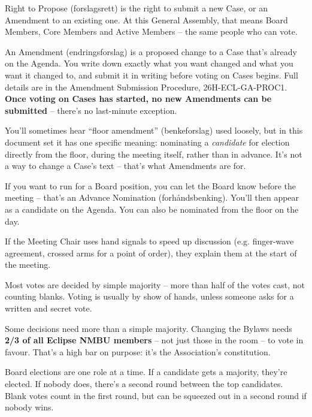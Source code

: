 \documentclass{../../../Common/Latex/Templates/rapport}
\begin{document}
Right to Propose (forslagsrett) is the right to submit a new Case, or an Amendment to an existing one. At this General Assembly, that means Board Members, Core Members and Active Members -- the same people who can vote.

An Amendment (endringsforslag) is a proposed change to a Case that's already on the Agenda. You write down exactly what you want changed and what you want it changed to, and submit it in writing before voting on Cases begins. Full details are in the Amendment Submission Procedure, 26H-ECL-GA-PROC1. \textbf{Once voting on Cases has started, no new Amendments can be submitted} -- there's no last-minute exception.

You'll sometimes hear ``floor amendment'' (benkeforslag) used loosely, but in this document set it has one specific meaning: nominating a \emph{candidate} for election directly from the floor, during the meeting itself, rather than in advance. It's not a way to change a Case's text -- that's what Amendments are for.

If you want to run for a Board position, you can let the Board know before the meeting -- that's an Advance Nomination (forhåndsbenking). You'll then appear as a candidate on the Agenda. You can also be nominated from the floor on the day.

If the Meeting Chair uses hand signals to speed up discussion (e.g. finger-wave agreement, crossed arms for a point of order), they explain them at the start of the meeting.

Most votes are decided by simple majority -- more than half of the votes cast, not counting blanks. Voting is usually by show of hands, unless someone asks for a written and secret vote.

Some decisions need more than a simple majority. Changing the Bylaws needs \textbf{2/3 of all Eclipse NMBU members} -- not just those in the room -- to vote in favour. That's a high bar on purpose: it's the Association's constitution.

Board elections are one role at a time. If a candidate gets a majority, they're elected. If nobody does, there's a second round between the top candidates. Blank votes count in the first round, but can be squeezed out in a second round if nobody wins.
\end{document}

